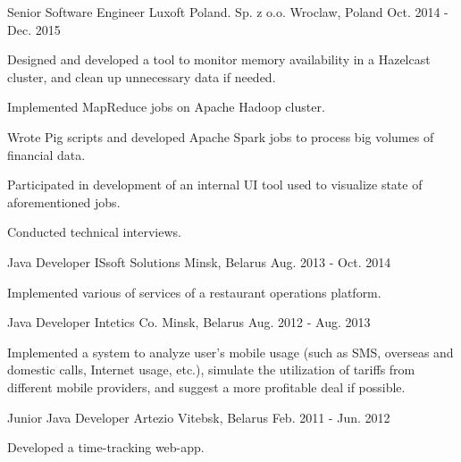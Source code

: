 \begin{cventries}
    \cventry
    {Senior Software Engineer} %
    {Luxoft Poland. Sp. z o.o.} %
    {Wroclaw, Poland} %
    {Oct. 2014 - Dec. 2015} %
    {
        \begin{cvitems} %
            \item {Designed and developed a tool to monitor memory availability in a Hazelcast cluster, and clean up unnecessary data if needed.}
            \item {Implemented MapReduce jobs on Apache Hadoop cluster.}
            \item {Wrote Pig scripts and developed Apache Spark jobs to process big volumes of financial data.}
            \item {Participated in development of an internal UI tool used to visualize state of aforementioned jobs.}
            \item {Conducted technical interviews.}
        \end{cvitems}
    }

    \cventry
    {Java Developer} %
    {ISsoft Solutions} %
    {Minsk, Belarus} %
    {Aug. 2013 - Oct. 2014} %
    {
        \begin{cvitems} %
            \item {Implemented various of services of a restaurant operations platform.}
        \end{cvitems}
    }

    \cventry
    {Java Developer} %
    {Intetics Co.} %
    {Minsk, Belarus} %
    {Aug. 2012 - Aug. 2013} %
    {
        \begin{cvitems} %
            \item {Implemented a system to analyze user’s mobile usage (such as SMS, overseas and domestic calls, Internet usage, etc.), simulate the utilization of tariffs from different mobile providers, and suggest a more profitable deal if possible.}
        \end{cvitems}
    }

    \cventry
    {Junior Java Developer} %
    {Artezio} %
    {Vitebsk, Belarus} %
    {Feb. 2011 - Jun. 2012} %
    {
        \begin{cvitems} %
            \item {Developed a time-tracking web-app.}
        \end{cvitems}
    }

\end{cventries}
